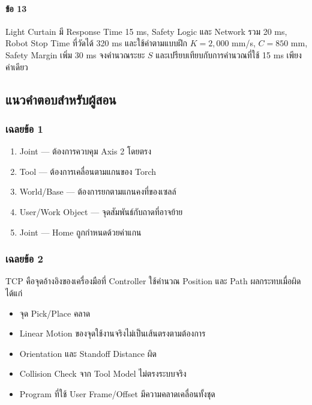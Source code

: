 \paragraph{ข้อ 13}

Light Curtain มี Response Time 15 ms, Safety Logic และ Network รวม 20 ms, Robot Stop Time ที่วัดได้ 320 ms และใช้ค่าตามแบบฝึก $K=2{,}000$ mm/s, $C=850$ mm, Safety Margin เพิ่ม 30 ms จงคำนวณระยะ $S$ และเปรียบเทียบกับการคำนวณที่ใช้ 15 ms เพียงค่าเดียว

\newpage

\subsection{แนวคำตอบสำหรับผู้สอน}

\subsubsection{เฉลยข้อ 1}

\begin{enumerate}
    \item Joint — ต้องการควบคุม Axis 2 โดยตรง
    \item Tool — ต้องการเคลื่อนตามแกนของ Torch
    \item World/Base — ต้องการยกตามแกนคงที่ของเซลล์
    \item User/Work Object — จุดสัมพันธ์กับถาดที่อาจย้าย
    \item Joint — Home ถูกกำหนดด้วยค่าแกน
\end{enumerate}

\subsubsection{เฉลยข้อ 2}

TCP คือจุดอ้างอิงของเครื่องมือที่ Controller ใช้คำนวณ Position และ Path ผลกระทบเมื่อผิด ได้แก่

\begin{itemize}
    \item จุด Pick/Place คลาด
    \item Linear Motion ของจุดใช้งานจริงไม่เป็นเส้นตรงตามต้องการ
    \item Orientation และ Standoff Distance ผิด
    \item Collision Check จาก Tool Model ไม่ตรงระบบจริง
    \item Program ที่ใช้ User Frame/Offset มีความคลาดเคลื่อนทั้งชุด
\end{itemize}

